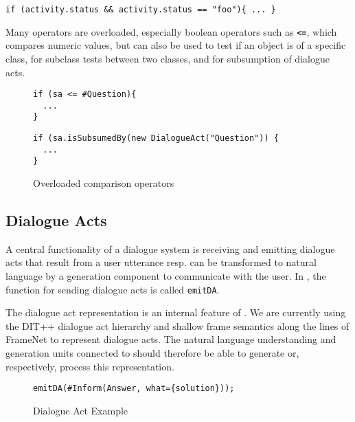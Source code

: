 \begin{lstlisting}
if (activity.status && activity.status == "foo"){ ... }
\end{lstlisting}

Many operators are overloaded, especially boolean operators such as
\textbf{\texttt{<=}}, which compares numeric values, but can also be used to
test if an object is of a specific class, for subclass tests between two
classes, and for subsumption of dialogue acts.

\begin{figure}[htbp]
\centering
{\footnotesize%
\begin{minipage}{0.28\textwidth}
\begin{lstlisting}
if (sa <= #Question){
  ...
}
\end{lstlisting}
\end{minipage}\vline\hspace{1em}
\begin{minipage}{0.6\textwidth}
\begin{lstlisting}
if (sa.isSubsumedBy(new DialogueAct("Question")) {
  ...
}
\end{lstlisting}
\end{minipage}}\vspace*{-2ex}
\caption{\label{tab:overloaded-comparison}Overloaded comparison operators}
\end{figure}

\subsection{Dialogue Acts}
\label{sec:caret}

A central functionality of a dialogue system is receiving and emitting dialogue
acts that result from a user utterance resp. can be transformed to natural
language by a generation component to communicate with the user. In \vonda,
the function for sending dialogue acts is called \texttt{emitDA}.

The dialogue act representation is an internal feature of \vonda. We are
currently using the DIT++ dialogue act hierarchy \citep{bunt2012iso} and
shallow frame semantics along the lines of FrameNet
\citep{ruppenhofer2016framenet} to represent dialogue acts. The natural
language understanding and generation units connected to \vonda should
therefore be able to generate or, respectively, process this representation.

\begin{figure}[htb]
  \centering\small\texttt{emitDA(\#Inform(Answer, what=\{solution\}));}
  \vspace*{-1ex}\caption{\label{fig:DA}Dialogue Act Example}
\end{figure}


